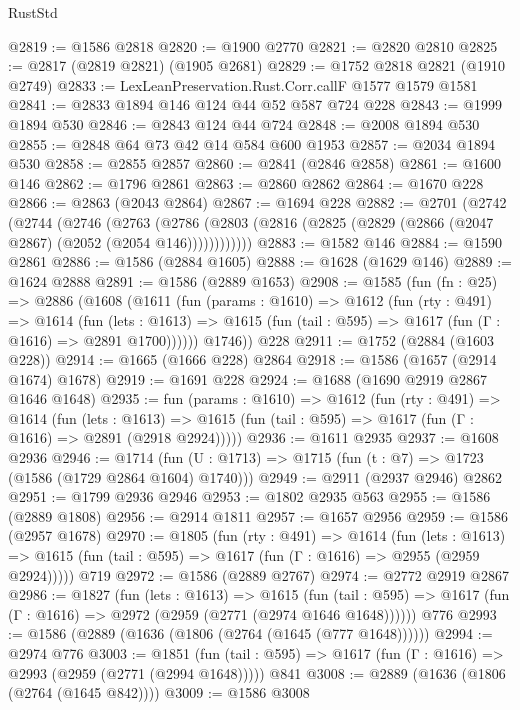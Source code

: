 \begin{lexlean}{RustStd}
\begin{coremodule}
@2819 := @1586 @2818
@2820 := @1900 @2770
@2821 := @2820 @2810
@2825 := @2817 (@2819 @2821) (@1905 @2681)
@2829 := @1752 @2818 @2821 (@1910 @2749)
@2833 := LexLeanPreservation.Rust.Corr.callF @1577 @1579 @1581
@2841 := @2833 @1894 @146 @124 @44 @52 @587 @724 @228
@2843 := @1999 @1894 @530
@2846 := @2843 @124 @44 @724
@2848 := @2008 @1894 @530
@2855 := @2848 @64 @73 @42 @14 @584 @600 @1953
@2857 := @2034 @1894 @530
@2858 := @2855 @2857
@2860 := @2841 (@2846 @2858)
@2861 := @1600 @146
@2862 := @1796 @2861
@2863 := @2860 @2862
@2864 := @1670 @228
@2866 := @2863 (@2043 @2864)
@2867 := @1694 @228
@2882 := @2701
    (@2742
      (@2744
        (@2746
          (@2763
            (@2786 (@2803 (@2816 (@2825 (@2829 (@2866 (@2047 @2867) (@2052 (@2054 @146))))))))))))
@2883 := @1582 @146
@2884 := @1590 @2861
@2886 := @1586 (@2884 @1605)
@2888 := @1628 (@1629 @146)
@2889 := @1624 @2888
@2891 := @1586 (@2889 @1653)
@2908 := @1585
    (fun (fn : @25) =>
    @2886
      (@1608
        (@1611
          (fun (params : @1610) =>
          @1612
            (fun (rty : @491) =>
            @1614
              (fun (lets : @1613) =>
              @1615 (fun (tail : @595) => @1617 (fun (Γ : @1616) => @2891 @1700))))))
        @1746))
    @228
@2911 := @1752 (@2884 (@1603 @228))
@2914 := @1665 (@1666 @228) @2864
@2918 := @1586 (@1657 (@2914 @1674) @1678)
@2919 := @1691 @228
@2924 := @1688 (@1690 @2919 @2867 @1646 @1648)
@2935 := fun (params : @1610) =>
  @1612
    (fun (rty : @491) =>
    @1614
      (fun (lets : @1613) =>
      @1615 (fun (tail : @595) => @1617 (fun (Γ : @1616) => @2891 (@2918 @2924)))))
@2936 := @1611 @2935
@2937 := @1608 @2936
@2946 := @1714 (fun (U : @1713) => @1715 (fun (t : @7) => @1723 (@1586 (@1729 @2864 @1604) @1740)))
@2949 := @2911 (@2937 @2946) @2862
@2951 := @1799 @2936 @2946
@2953 := @1802 @2935 @563
@2955 := @1586 (@2889 @1808)
@2956 := @2914 @1811
@2957 := @1657 @2956
@2959 := @1586 (@2957 @1678)
@2970 := @1805
    (fun (rty : @491) =>
    @1614
      (fun (lets : @1613) =>
      @1615 (fun (tail : @595) => @1617 (fun (Γ : @1616) => @2955 (@2959 @2924)))))
    @719
@2972 := @1586 (@2889 @2767)
@2974 := @2772 @2919 @2867
@2986 := @1827
    (fun (lets : @1613) =>
    @1615
      (fun (tail : @595) => @1617 (fun (Γ : @1616) => @2972 (@2959 (@2771 (@2974 @1646 @1648))))))
    @776
@2993 := @1586 (@2889 (@1636 (@1806 (@2764 (@1645 (@777 @1648))))))
@2994 := @2974 @776
@3003 := @1851
    (fun (tail : @595) => @1617 (fun (Γ : @1616) => @2993 (@2959 (@2771 (@2994 @1648)))))
    @841
@3008 := @2889 (@1636 (@1806 (@2764 (@1645 @842))))
@3009 := @1586 @3008

\end{coremodule}
\end{lexlean}
